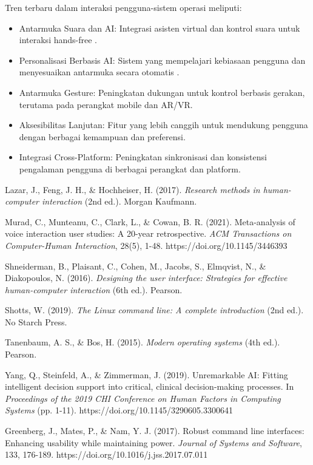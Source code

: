 \documentclass[12pt]{article}
\begin{document}
		Tren terbaru dalam interaksi pengguna-sistem operasi meliputi:
		\begin{itemize}
			\item Antarmuka Suara dan AI: Integrasi asisten virtual dan kontrol suara untuk interaksi hands-free \cite{Murad2021}.
			\item Personalisasi Berbasis AI: Sistem yang mempelajari kebiasaan pengguna dan menyesuaikan antarmuka secara otomatis \cite{Yang2019}.
			\item Antarmuka Gesture: Peningkatan dukungan untuk kontrol berbasis gerakan, terutama pada perangkat mobile dan AR/VR.
			\item Aksesibilitas Lanjutan: Fitur yang lebih canggih untuk mendukung pengguna dengan berbagai kemampuan dan preferensi.
			\item Integrasi Cross-Platform: Peningkatan sinkronisasi dan konsistensi pengalaman pengguna di berbagai perangkat dan platform.
		\end{itemize}
		\begin{thebibliography}{9}
			
			Lazar, J., Feng, J. H., \& Hochheiser, H. (2017). \textit{Research methods in human-computer interaction} (2nd ed.). Morgan Kaufmann.
			
			Murad, C., Munteanu, C., Clark, L., \& Cowan, B. R. (2021). Meta-analysis of voice interaction user studies: A 20-year retrospective. \textit{ACM Transactions on Computer-Human Interaction}, 28(5), 1-48. https://doi.org/10.1145/3446393
			
			Shneiderman, B., Plaisant, C., Cohen, M., Jacobs, S., Elmqvist, N., \& Diakopoulos, N. (2016). \textit{Designing the user interface: Strategies for effective human-computer interaction} (6th ed.). Pearson.
			
			Shotts, W. (2019). \textit{The Linux command line: A complete introduction} (2nd ed.). No Starch Press.
			
			Tanenbaum, A. S., \& Bos, H. (2015). \textit{Modern operating systems} (4th ed.). Pearson.
			
			Yang, Q., Steinfeld, A., \& Zimmerman, J. (2019). Unremarkable AI: Fitting intelligent decision support into critical, clinical decision-making processes. In \textit{Proceedings of the 2019 CHI Conference on Human Factors in Computing Systems} (pp. 1-11). https://doi.org/10.1145/3290605.3300641
			
			Greenberg, J., Mates, P., \& Nam, Y. J. (2017). Robust command line interfaces: Enhancing usability while maintaining power. \textit{Journal of Systems and Software}, 133, 176-189. https://doi.org/10.1016/j.jss.2017.07.011
			
		\end{thebibliography}
	
\end{document}

